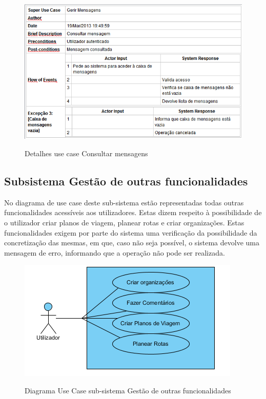 ﻿\documentclass[12pt,a4paper]{article}
\begin{document}
\begin{figure}[h!]
\centering
\includegraphics[scale=0.7]{d_usecase/consultarmensagem}
\label{usecase}
\caption{Detalhes use case Consultar mensagens}
\end{figure}

\clearpage
\newpage

\subsection{Subsistema Gestão de outras funcionalidades}
No diagrama de use case deste sub-sistema estão representadas todas outras funcionalidades acessíveis aos utilizadores. Estas dizem respeito à possibilidade de o utilizador criar planos de viagem, planear rotas e criar organizações. Estas funcionalidades exigem por parte do sistema uma verificação da possibilidade da concretização das mesmas, em que, caso não seja possível, o sistema devolve uma mensagem de erro, informando que a operação não pode ser realizada.\\

\begin{figure}[h!]
\centering
\includegraphics[scale=1]{usecase/U_FazerCenas}
\label{usecase}
\caption{Diagrama Use Case sub-sistema Gestão de outras funcionalidades}
\end{figure}
\end{document}
